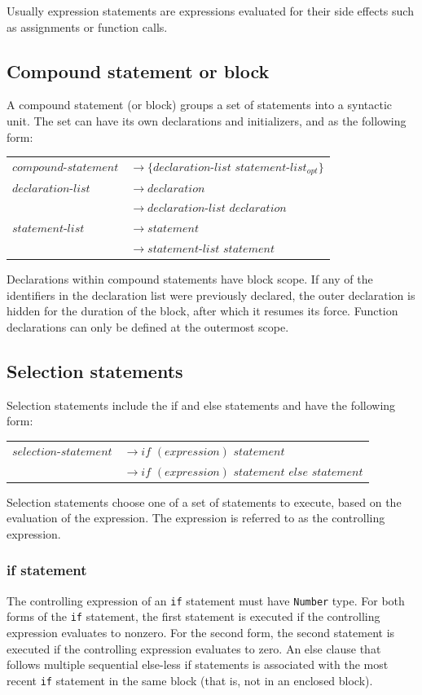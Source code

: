 \documentclass[12pt,A4]{book}
\begin{document}
Usually expression statements are expressions evaluated for their side effects such as assignments or function calls.
\subsection{Compound statement or block}
A compound statement (or block) groups a set of statements into a syntactic unit.  The set can have its own declarations and initializers, and as the following form:

\begin{tabular}{l l}
$compound\mbox{-}statement$  & $\rightarrow \{declaration\mbox{-}list$ $statement\mbox{-}list_{opt}\}$\\
$declaration\mbox{-}list$ & $\rightarrow declaration$\\
& $\rightarrow declaration\mbox{-}list$ $declaration$\\
$statement\mbox{-}list$  & $\rightarrow statement$\\
& $\rightarrow statement\mbox{-}list$ $statement$\\
\end{tabular}

Declarations within compound statements have block scope.  If any of the identifiers in the declaration list were previously declared, the outer declaration is hidden for the duration of the block, after which it resumes its force.  Function declarations can only be defined at the outermost scope.
\subsection{Selection statements}
Selection statements include the if and else statements and have the following form:

\begin{tabular}{l l}
$selection\mbox{-}statement$ & $\rightarrow if$ $(expression)$ $statement$\\
& $\rightarrow if$ $(expression)$ $statement$ $else$ $statement$
\end{tabular}

Selection statements choose one of a set of statements to execute, based on the evaluation of the expression.  The expression is referred to as the controlling expression.
\subsubsection{if statement}
The controlling expression of an \verb|if| statement must have \verb|Number| type. For both forms of the \verb|if| statement, the first statement is executed if the controlling expression evaluates to nonzero.  For the second form, the second statement is executed if the controlling expression evaluates to zero.  An else clause that follows multiple sequential else-less if statements is associated with the most recent \verb|if| statement in the same block (that is, not in an enclosed block).
\end{document}
